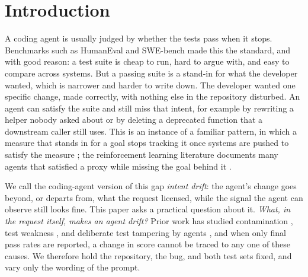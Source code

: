 \section{Introduction}
\label{sec:intro}

A coding agent is usually judged by whether the tests pass when it stops.
Benchmarks such as HumanEval \citep{chen2021evaluating} and SWE-bench
\citep{jimenez2024swebench} made this the standard, and with good reason: a
test suite is cheap to run, hard to argue with, and easy to compare across
systems. But a passing suite is a stand-in for what the developer wanted,
which is narrower and harder to write down. The developer wanted one specific
change, made correctly, with nothing else in the repository disturbed. An agent
can satisfy the suite and still miss that intent, for example by rewriting a
helper nobody asked about or by deleting a deprecated function that a
downstream caller still uses. This is an instance of a familiar pattern, in which a
measure that stands in for a goal stops tracking it once systems are pushed to
satisfy the measure \citep{manheim2018categorizing}; the reinforcement
learning literature documents many agents that satisfied a proxy while
missing the goal behind it
\citep{krakovna2020specification,pan2022effects}.

We call the coding-agent version of this gap \emph{intent drift}: the agent's
change goes beyond, or departs from, what the request licensed, while the
signal the agent can observe still looks fine. This paper asks a practical
question about it. \emph{What, in the request itself, makes an agent drift?}
Prior work has studied contamination \citep{riddell2024quantifying,matton2024leakage}, test weakness
\citep{liu2023evalplus,aleithan2024swebench}, and deliberate test tampering by agents
\citep{zhong2025impossiblebench}, and when only final pass rates are reported, a
change in score cannot be traced to any one of these causes. We therefore hold the repository, the bug, and both
test sets fixed, and vary only the wording of the prompt.

